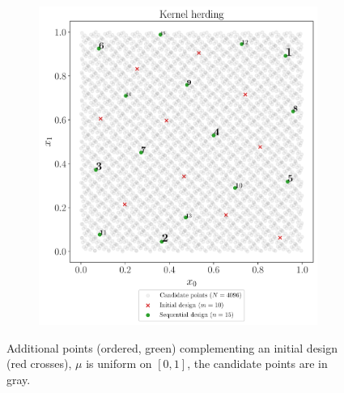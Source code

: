 \begin{figure}
\begin{subfigure}[b]{0.48\linewidth}
    \end{subfigure}
    \\
    \begin{subfigure}[b]{0.48\linewidth}
        \centering
        \includegraphics[width=\textwidth]{./part2/figures/SIS/uniform2D_KH.pdf}
    \end{subfigure}
    \caption{Additional points (ordered, green) complementing an initial design (red crosses), $\mu$ is uniform on $[0,1]$, the candidate points are in gray.}
    \label{fig:uniform_validation_designs}
\end{figure}

